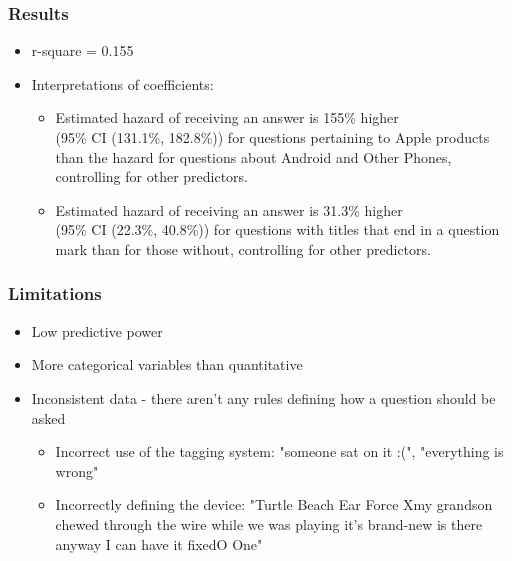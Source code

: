 \documentclass{beamer}
\begin{document}
\begin{frame}
\frametitle{Results}

  \begin{itemize}
      \item r-square = 0.155
  \bigskip
      \item Interpretations of coefficients:
      \begin{itemize}
          \bigskip
          \item Estimated hazard of receiving an answer is 155\% higher \\ (95\% CI (131.1\%, 182.8\%)) 
          for questions pertaining to Apple products than the hazard for questions about Android and Other Phones,
          controlling for other predictors.
          \bigskip
          \item Estimated hazard of receiving an answer is 31.3\% higher \\ (95\% CI (22.3\%, 40.8\%)) 
          for questions with titles that end in a question mark than for those without, 
          controlling for other predictors.
          
      \end{itemize}
  \end{itemize}
  
\end{frame}


\begin{frame}
\frametitle{Limitations}

  \begin{itemize}
      \item Low predictive power 
      \item More categorical variables than quantitative 
      \item Inconsistent data - there aren't any rules defining how a question should be asked
      \smallskip
      \begin{itemize}
          \item Incorrect use of the tagging system: "someone sat on it :(", "everything is wrong"
          \item Incorrectly defining the device: "Turtle Beach Ear Force Xmy grandson chewed through the wire while we was playing it's brand-new is there anyway I can have it fixedO One"
      \end{itemize}
  \end{itemize}

\end{frame}

 
\end{document}
